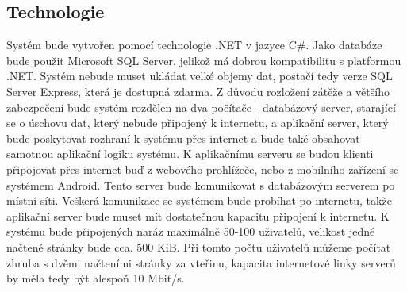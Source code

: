 \documentclass[a4paper,10pt,titlepage]{article}
\begin{document}
	\subsection{Technologie}
		Systém bude vytvořen pomocí technologie .NET v jazyce C\#. Jako databáze bude použit Microsoft SQL Server, jelikož má dobrou
		kompatibilitu s platformou .NET. Systém nebude muset ukládat velké objemy dat, postačí tedy verze SQL Server Express, která je dostupná zdarma.
		Z důvodu rozložení zátěže a většího zabezpečení bude systém rozdělen na dva počítače - databázový server, starající se o
		úschovu dat, který nebude připojený k internetu, a aplikační server, který bude poskytovat rozhraní k systému přes internet a bude také obsahovat
		samotnou aplikační logiku systému. K aplikačnímu serveru se budou klienti připojovat přes internet buď z webového prohlížeče, nebo z mobilního zařízení
		se systémem Android. Tento server bude komunikovat s databázovým serverem po místní síti. Veškerá komunikace se systémem bude probíhat po internetu, takže
		aplikační server bude muset mít dostatečnou kapacitu připojení k internetu. K systému bude připojených naráz maximálně 50-100 uživatelů, velikost jedné
		načtené stránky bude cca. 500 KiB. Při tomto počtu uživatelů můžeme počítat zhruba s dvěmi načteními stránky za vteřinu, kapacita internetové linky
		serverů by měla tedy být alespoň 10 Mbit/s.
\end{document}
